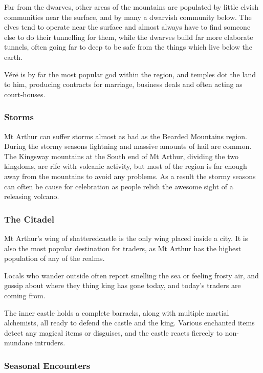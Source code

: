 \begin{multicols}{2}
Far from the dwarves, other areas of the mountains are populated by little elvish communities near the surface, and by many a dwarvish community below.  The elves tend to operate near the surface and almost always have to find someone else to do their tunnelling for them, while the dwarves build far more elaborate tunnels, often going far to deep to be safe from the things which live below the earth.

V\'{e}r\"{e} is by far the most popular god within the region, and temples dot the land to him, producing contracts for marriage, business deals and often acting as court-houses.

\subsubsection{Storms}

Mt Arthur can suffer storms almost as bad as the Bearded Mountains region.
During the stormy seasons lightning and massive amounts of hail are common.
The Kingsway mountains at the South end of Mt Arthur, dividing the two kingdoms, are rife with volcanic activity, but most of the region is far enough away from the mountains to avoid any problems.
As a result the stormy seasons can often be cause for celebration as people relish the awesome sight of a releasing volcano.

\subsubsection{The Citadel}

Mt Arthur's wing of \gls{shatteredcastle} is the only wing placed inside a city.
It is also the most popular destination for traders, as Mt Arthur has the highest population of any of the realms.

Locals who wander outside often report smelling the sea or feeling frosty air, and gossip about where they thing \gls{king} has gone today, and today's traders are coming from.

The inner castle holds a complete barracks, along with multiple martial alchemists, all ready to defend the castle and the king.
Various enchanted items detect any magical items or disguises, and the castle reacts fiercely to non-mundane intruders.

\subsubsection{Seasonal Encounters}


\end{multicols}
